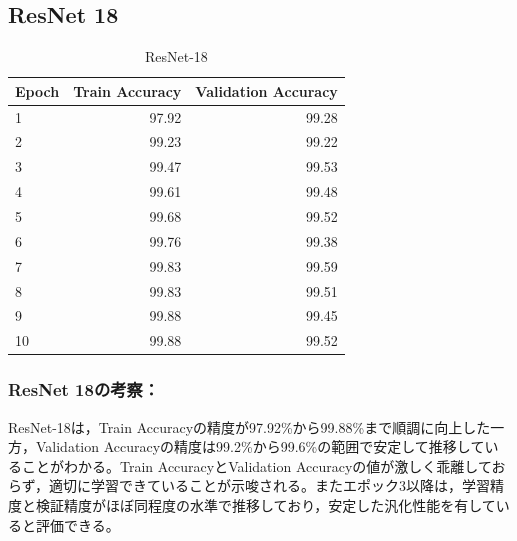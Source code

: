 \documentclass[a4paper,11pt,titlepage]{jsarticle}
\begin{document}
\subsection{ResNet 18}
\begin{table}[H]
\centering
\caption{ResNet-18}
\label{tab:ResNet18}
\begin{tabular}{lrr}
\hline
 Epoch &  Train Accuracy &  Validation Accuracy \\
\hline
     1 &           97.92 &                99.28 \\
     2 &           99.23 &                99.22 \\
     3 &           99.47 &                99.53 \\
     4 &           99.61 &                99.48 \\
     5 &           99.68 &                99.52 \\
     6 &           99.76 &                99.38 \\
     7 &           99.83 &                99.59 \\
     8 &           99.83 &                99.51 \\
     9 &           99.88 &                99.45 \\
    10 &           99.88 &                99.52 \\
\hline
\end{tabular}
\end{table}



\subsubsection*{ResNet 18の考察：}
ResNet-18は，Train Accuracyの精度が97.92\%から99.88\%まで順調に向上した一方，Validation Accuracyの精度は99.2\%から99.6\%の範囲で安定して推移していることがわかる。Train AccuracyとValidation Accuracyの値が激しく乖離しておらず，適切に学習できていることが示唆される。またエポック3以降は，学習精度と検証精度がほぼ同程度の水準で推移しており，安定した汎化性能を有していると評価できる。
\end{document}
